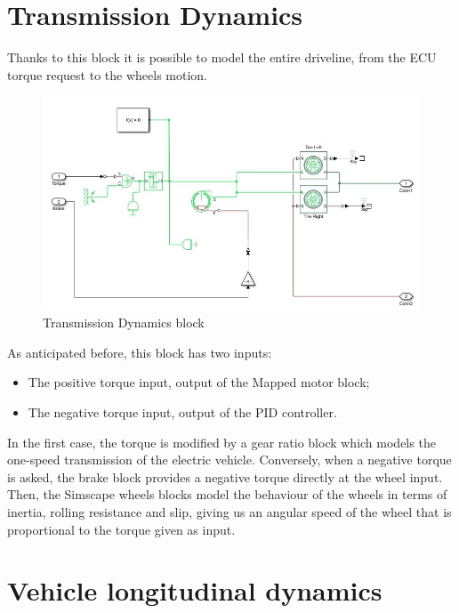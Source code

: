 \documentclass[12pt,a4paper]{report}
\begin{document}
\section{Transmission Dynamics}



Thanks to this block it is possible to model the entire driveline, from the ECU torque request to the wheels motion.
 
 \begin{figure}[htbp]
 	\centering
 	\includegraphics[scale=0.8]{TransmissionDynamics.jpg}
 	\caption{Transmission Dynamics block}
 \end{figure}

As anticipated before, this block has two inputs:
\begin{itemize}
	
	\item The positive torque input, output of the Mapped motor block; 
	
	\item The negative torque input, output of the PID controller.
	
\end{itemize}

In the first case, the torque is modified by a gear ratio block which models the one-speed transmission of the electric vehicle. Conversely, when a negative torque is asked, the brake block provides a negative torque directly at the wheel input. Then, the Simscape wheels blocks model the behaviour of the wheels in terms of inertia, rolling resistance and slip, giving us an angular speed of the wheel that is proportional to the torque given as input.

\section{Vehicle longitudinal dynamics}
\end{document}
